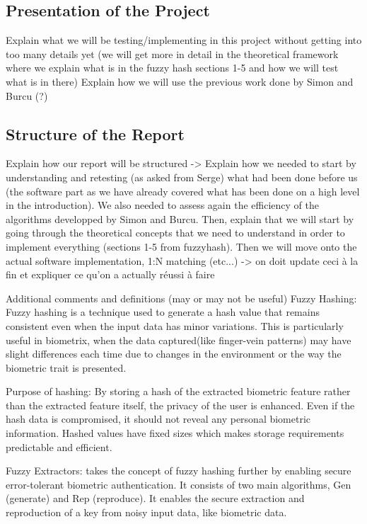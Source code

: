 \subsection{Presentation of the Project}
Explain what we will be testing/implementing in this project without getting into too many details yet (we will get more in detail in the theoretical framework where we explain what is in the fuzzy hash sections 1-5 and how we will test what is in there)
Explain how we will use the previous work done by Simon and Burcu (?) 

\subsection{Structure of the Report}
Explain how our report will be structured -> Explain how we needed to start by understanding and retesting (as asked from Serge) what had been done before us (the software part as we have already covered what has been done on a high level in the introduction). We also needed to assess again the efficiency of the algorithms developped by Simon and Burcu. Then, explain that we will start by going through the theoretical concepts that we need to understand in order to implement everything (sections 1-5 from fuzzyhash). Then we will move onto the actual software implementation, 1:N matching (etc...) -> on doit update ceci à la fin et expliquer ce qu'on a actually réussi à faire


Additional comments and definitions (may or may not be useful)
Fuzzy Hashing: Fuzzy hashing is a technique used to generate a hash value that remains consistent even when the input data has minor variations. This is particularly useful in biometrix, when the data captured(like finger-vein patterns) may have slight differences each time due to changes in the environment or the way the biometric trait is presented.

Purpose of hashing: By storing a hash of the extracted biometric feature rather than the extracted feature itself, the privacy of the user is enhanced. Even if the hash data is compromised, it should not reveal any personal biometric information. Hashed values have fixed sizes which makes storage requirements predictable and efficient. 

Fuzzy Extractors: takes the concept of fuzzy hashing further by enabling secure error-tolerant biometric authentication. It consists of two main algorithms, Gen (generate) and Rep (reproduce). It enables the secure extraction and reproduction of a key from noisy input data, like biometric data. 
